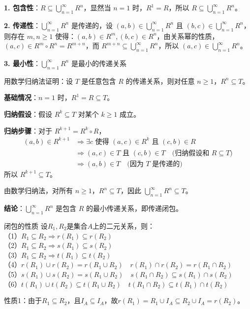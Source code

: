 \textbf{1. 包含性}：$R \subseteq \bigcup_{n=1}^{\infty} R^n$，显然当 $n=1$ 时，$R^1 = R$，所以 $R \subseteq \bigcup_{n=1}^{\infty} R^n$。

\textbf{2. 传递性}：$\bigcup_{n=1}^{\infty} R^n$ 是传递的，设 $(a,b) \in \bigcup_{n=1}^{\infty} R^n$ 且 $(b,c) \in \bigcup_{n=1}^{\infty} R^n$，则存在 $m,n \geq 1$ 使得：$(a,b) \in R^m ,(b,c) \in R^n$，由关系幂的性质，$(a,c) \in R^m \circ R^n = R^{m+n}$，而 $R^{m+n} \subseteq \bigcup_{n=1}^{\infty} R^n$，所以 $(a,c) \in \bigcup_{n=1}^{\infty} R^n$。

\textbf{3. 最小性}：$\bigcup_{n=1}^{\infty} R^n$ 是最小的传递关系

用数学归纳法证明：设 $T$ 是任意包含 $R$ 的传递关系，则对任意 $n \geq 1$，$R^n \subseteq T$。

\textbf{基础情况}：$n=1$ 时，$R^1 = R \subseteq T$。

\textbf{归纳假设}：假设 $R^k \subseteq T$ 对某个 $k \geq 1$ 成立。

\textbf{归纳步骤}：对于 $R^{k+1} = R^k \circ R$，
\begin{align*}
(a,b) \in R^{k+1} &\Rightarrow \exists c \text{ 使得 } (a,c) \in R^k \text{ 且 } (c,b) \in R \\
&\Rightarrow (a,c) \in T \text{ 且 } (c,b) \in T \quad \text{(归纳假设和 $R \subseteq T$)} \\
&\Rightarrow (a,b) \in T \quad \text{(因为 $T$ 是传递的)}
\end{align*}
所以 $R^{k+1} \subseteq T$。

由数学归纳法，对所有 $n \geq 1$，$R^n \subseteq T$，因此 $\bigcup_{n=1}^{\infty} R^n \subseteq T$。

\textbf{结论}：$\bigcup_{n=1}^{\infty} R^n$ 是包含 $R$ 的最小传递关系，即传递闭包。
\begin{theorem}{闭包的性质}{}
设$R_1,R_2$是集合$A$上的二元关系，则：\\
（1）$R_1\subseteq R_2\Rightarrow r(R_1)\subseteq r(R_2)$\\
（2）$R_1\subseteq R_2\Rightarrow s(R_1)\subseteq s(R_2)$\\
（3）$R_1\subseteq R_2\Rightarrow t(R_1)\subseteq t(R_2)$\\
（4）$r(R_1)\cup r(R_2)=r(R_1\cup R_2)\quad r(R_1)\cap r(R_2)=r(R_1\cap R_2)$\\
（5）$s(R_1)\cup s(R_2)=s(R_1\cup R_2)\quad s(R_1\cap R_2)\subseteq s(R_1)\cap s(R_2)$\\
（6）$t(R_1)\cup t(R_2)\subseteq t(R_1\cup R_2)\quad t(R_1\cap R_2)\subseteq t(R_1)\cap t(R_2)$
\end{theorem}
性质1：由于$R_1 \subseteq R_2$，且$I_A \subseteq I_A$，故$r(R_1) = R_1 \cup I_A \subseteq R_2 \cup I_A = r(R_2)$。

